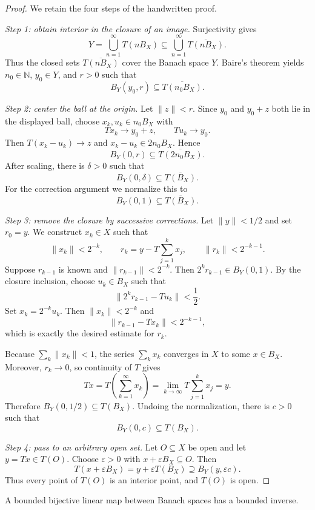 \begin{proof}
We retain the four steps of the handwritten proof.

\emph{Step 1: obtain interior in the closure of an image.}
Surjectivity gives
\[
  Y=\bigcup_{n=1}^{\infty}T(nB_X)
   \subseteq\bigcup_{n=1}^{\infty}\overline{T(nB_X)}.
\]
Thus the closed sets $\overline{T(nB_X)}$ cover the Banach space $Y$.
Baire's theorem yields $n_0\in\mathbb N$, $y_0\in Y$, and $r>0$ such that
\[
  B_Y(y_0,r)\subseteq\overline{T(n_0B_X)}.
\]

\emph{Step 2: center the ball at the origin.}
Let $\|z\|<r$.  Since $y_0$ and $y_0+z$ both lie in the displayed ball,
choose $x_k,u_k\in n_0B_X$ with
\[
  Tx_k\to y_0+z,
  \qquad
  Tu_k\to y_0.
\]
Then $T(x_k-u_k)\to z$ and $x_k-u_k\in2n_0B_X$.  Hence
\[
  B_Y(0,r)\subseteq\overline{T(2n_0B_X)}.
\]
After scaling, there is $\delta>0$ such that
\[
  B_Y(0,\delta)\subseteq\overline{T(B_X)}.
\]
For the correction argument we normalize this to
\[
  B_Y(0,1)\subseteq\overline{T(B_X)}.
\]

\emph{Step 3: remove the closure by successive corrections.}
Let $\|y\|<1/2$ and set $r_0=y$.  We construct $x_k\in X$ such that
\[
  \|x_k\|<2^{-k},
  \qquad
  r_k=y-T\sum_{j=1}^kx_j,
  \qquad
  \|r_k\|<2^{-k-1}.
\]
Suppose $r_{k-1}$ is known and $\|r_{k-1}\|<2^{-k}$.  Then
$2^kr_{k-1}\in B_Y(0,1)$.  By the closure inclusion, choose $u_k\in B_X$
such that
\[
  \|2^kr_{k-1}-Tu_k\|<\frac12.
\]
Set $x_k=2^{-k}u_k$.  Then $\|x_k\|<2^{-k}$ and
\[
  \|r_{k-1}-Tx_k\|<2^{-k-1},
\]
which is exactly the desired estimate for $r_k$.

Because $\sum_k\|x_k\|<1$, the series $\sum_kx_k$ converges in $X$ to some
$x\in B_X$.  Moreover, $r_k\to0$, so continuity of $T$ gives
\[
  Tx=T\left(\sum_{k=1}^{\infty}x_k\right)
     =\lim_{k\to\infty}T\sum_{j=1}^kx_j
     =y.
\]
Therefore $B_Y(0,1/2)\subseteq T(B_X)$.  Undoing the normalization, there is
$c>0$ such that
\[
  B_Y(0,c)\subseteq T(B_X).
\]

\emph{Step 4: pass to an arbitrary open set.}
Let $O\subseteq X$ be open and let $y=Tx\in T(O)$.  Choose
$\varepsilon>0$ with $x+\varepsilon B_X\subseteq O$.  Then
\[
  T(x+\varepsilon B_X)
  =y+\varepsilon T(B_X)
  \supseteq B_Y(y,\varepsilon c).
\]
Thus every point of $T(O)$ is an interior point, and $T(O)$ is open.
\end{proof}

\begin{notecorollary}
A bounded bijective linear map between Banach spaces has a bounded inverse.
\end{notecorollary}

